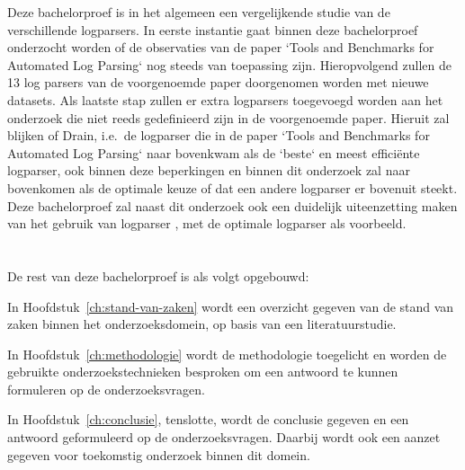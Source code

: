 Deze bachelorproef is in het algemeen een vergelijkende studie van de verschillende logparsers. In eerste instantie gaat binnen deze bachelorproef onderzocht worden of de observaties van de paper `Tools and Benchmarks for Automated Log Parsing` \autocite{TBA2019} nog steeds van toepassing zijn. Hieropvolgend zullen de 13 log parsers van de voorgenoemde paper doorgenomen worden met nieuwe datasets. Als laatste stap zullen er extra logparsers toegevoegd worden aan het onderzoek die niet reeds gedefinieerd zijn in de voorgenoemde paper. Hieruit zal blijken of Drain, i.e.\ de logparser die in de paper `Tools and Benchmarks for Automated Log Parsing` \autocite{TBA2019} naar bovenkwam als de `beste` en meest efficiënte logparser, ook binnen deze beperkingen en binnen dit onderzoek zal naar bovenkomen als de optimale keuze of dat een andere logparser er bovenuit steekt. Deze bachelorproef zal naast dit onderzoek ook een duidelijk uiteenzetting maken van het gebruik van logparser \autocite{TBA2019}, met de optimale logparser als voorbeeld. 

\section{}
\label{sec:opzet-bachelorproef}


De rest van deze bachelorproef is als volgt opgebouwd:

In Hoofdstuk~\ref{ch:stand-van-zaken} wordt een overzicht gegeven van de stand van zaken binnen het onderzoeksdomein, op basis van een literatuurstudie.

In Hoofdstuk~\ref{ch:methodologie} wordt de methodologie toegelicht en worden de gebruikte onderzoekstechnieken besproken om een antwoord te kunnen formuleren op de onderzoeksvragen.


In Hoofdstuk~\ref{ch:conclusie}, tenslotte, wordt de conclusie gegeven en een antwoord geformuleerd op de onderzoeksvragen. Daarbij wordt ook een aanzet gegeven voor toekomstig onderzoek binnen dit domein.